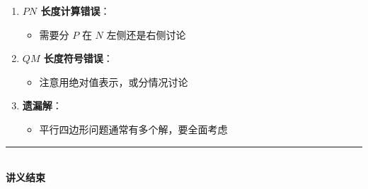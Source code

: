 \documentclass[UTF8]{ctexart}
\newenvironment{redenv}{\color{red}}{}
\begin{document}
\begin{redenv}
\begin{enumerate}[label=\arabic*.]
    \item \textbf{$PN$ 长度计算错误}：
    \begin{itemize}
        \item 需要分 $P$ 在 $N$ 左侧还是右侧讨论
    \end{itemize}
    
    \item \textbf{$QM$ 长度符号错误}：
    \begin{itemize}
        \item 注意用绝对值表示，或分情况讨论
    \end{itemize}
    
    \item \textbf{遗漏解}：
    \begin{itemize}
        \item 平行四边形问题通常有多个解，要全面考虑
    \end{itemize}
\end{enumerate}
\end{redenv}

\vspace{2em}
\begin{center}
\rule{0.6\textwidth}{0.5pt}\\[0.5em]
{\large\bfseries 讲义结束}
\end{center}
\end{document}
